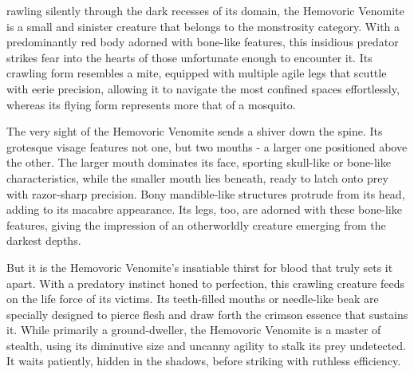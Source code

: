 \documentclass[letterpaper,openany,twoside,twocolumn]{book}
\begin{document}

\MonsterSheetGeometry

\mainmatter%



\entryfont \noindent {}rawling silently through the dark recesses of its domain, the Hemovoric Venomite is a small and sinister creature that belongs to the monstrosity category. With a predominantly red body adorned with bone-like features, this insidious predator strikes fear into the hearts of those unfortunate enough to encounter it. Its crawling form resembles a mite, equipped with multiple agile legs that scuttle with eerie precision, allowing it to navigate the most confined spaces effortlessly, whereas its flying form represents more that of a mosquito.

The very sight of the Hemovoric Venomite sends a shiver down the spine. Its grotesque visage features not one, but two mouths - a larger one positioned above the other. The larger mouth dominates its face, sporting skull-like or bone-like characteristics, while the smaller mouth lies beneath, ready to latch onto prey with razor-sharp precision. Bony mandible-like structures protrude from its head, adding to its macabre appearance. Its legs, too, are adorned with these bone-like features, giving the impression of an otherworldly creature emerging from the darkest depths.

But it is the Hemovoric Venomite's insatiable thirst for blood that truly sets it apart. With a predatory instinct honed to perfection, this crawling creature feeds on the life force of its victims. Its teeth-filled mouths or needle-like beak are specially designed to pierce flesh and draw forth the crimson essence that sustains it. While primarily a ground-dweller, the Hemovoric Venomite is a master of stealth, using its diminutive size and uncanny agility to stalk its prey undetected. It waits patiently, hidden in the shadows, before striking with ruthless efficiency.
\end{document}
